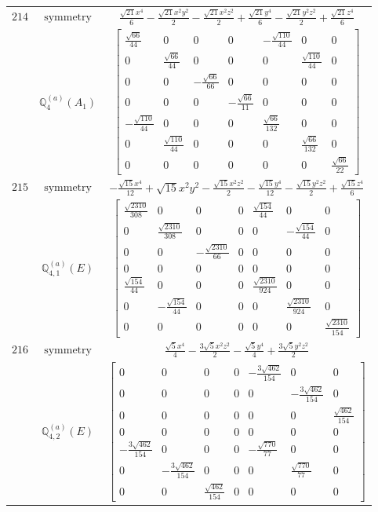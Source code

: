 \documentclass[fleqn,8pt,landscape]{jsarticle}
\begin{document}
\begin{longtable}{ccc}
$ 214 $ & $ \text{symmetry} $ & $ \frac{\sqrt{21} x^{4}}{6} - \frac{\sqrt{21} x^{2} y^{2}}{2} - \frac{\sqrt{21} x^{2} z^{2}}{2} + \frac{\sqrt{21} y^{4}}{6} - \frac{\sqrt{21} y^{2} z^{2}}{2} + \frac{\sqrt{21} z^{4}}{6} $ \\
$  $ & $ \mathbb{Q}_{4}^{(a)}(A_{1}) $ & $ \begin{bmatrix} \frac{\sqrt{66}}{44} & 0 & 0 & 0 & - \frac{\sqrt{110}}{44} & 0 & 0 \\ 0 & \frac{\sqrt{66}}{44} & 0 & 0 & 0 & \frac{\sqrt{110}}{44} & 0 \\ 0 & 0 & - \frac{\sqrt{66}}{66} & 0 & 0 & 0 & 0 \\ 0 & 0 & 0 & - \frac{\sqrt{66}}{11} & 0 & 0 & 0 \\ - \frac{\sqrt{110}}{44} & 0 & 0 & 0 & \frac{\sqrt{66}}{132} & 0 & 0 \\ 0 & \frac{\sqrt{110}}{44} & 0 & 0 & 0 & \frac{\sqrt{66}}{132} & 0 \\ 0 & 0 & 0 & 0 & 0 & 0 & \frac{\sqrt{66}}{22} \end{bmatrix} $ \\ \hline
$ 215 $ & $ \text{symmetry} $ & $ - \frac{\sqrt{15} x^{4}}{12} + \sqrt{15} x^{2} y^{2} - \frac{\sqrt{15} x^{2} z^{2}}{2} - \frac{\sqrt{15} y^{4}}{12} - \frac{\sqrt{15} y^{2} z^{2}}{2} + \frac{\sqrt{15} z^{4}}{6} $ \\
$  $ & $ \mathbb{Q}_{4,1}^{(a)}(E) $ & $ \begin{bmatrix} \frac{\sqrt{2310}}{308} & 0 & 0 & 0 & \frac{\sqrt{154}}{44} & 0 & 0 \\ 0 & \frac{\sqrt{2310}}{308} & 0 & 0 & 0 & - \frac{\sqrt{154}}{44} & 0 \\ 0 & 0 & - \frac{\sqrt{2310}}{66} & 0 & 0 & 0 & 0 \\ 0 & 0 & 0 & 0 & 0 & 0 & 0 \\ \frac{\sqrt{154}}{44} & 0 & 0 & 0 & \frac{\sqrt{2310}}{924} & 0 & 0 \\ 0 & - \frac{\sqrt{154}}{44} & 0 & 0 & 0 & \frac{\sqrt{2310}}{924} & 0 \\ 0 & 0 & 0 & 0 & 0 & 0 & \frac{\sqrt{2310}}{154} \end{bmatrix} $ \\ \hline
$ 216 $ & $ \text{symmetry} $ & $ \frac{\sqrt{5} x^{4}}{4} - \frac{3 \sqrt{5} x^{2} z^{2}}{2} - \frac{\sqrt{5} y^{4}}{4} + \frac{3 \sqrt{5} y^{2} z^{2}}{2} $ \\
$  $ & $ \mathbb{Q}_{4,2}^{(a)}(E) $ & $ \begin{bmatrix} 0 & 0 & 0 & 0 & - \frac{3 \sqrt{462}}{154} & 0 & 0 \\ 0 & 0 & 0 & 0 & 0 & - \frac{3 \sqrt{462}}{154} & 0 \\ 0 & 0 & 0 & 0 & 0 & 0 & \frac{\sqrt{462}}{154} \\ 0 & 0 & 0 & 0 & 0 & 0 & 0 \\ - \frac{3 \sqrt{462}}{154} & 0 & 0 & 0 & - \frac{\sqrt{770}}{77} & 0 & 0 \\ 0 & - \frac{3 \sqrt{462}}{154} & 0 & 0 & 0 & \frac{\sqrt{770}}{77} & 0 \\ 0 & 0 & \frac{\sqrt{462}}{154} & 0 & 0 & 0 & 0 \end{bmatrix} $ \\ \hline

\end{longtable}
\end{document}
